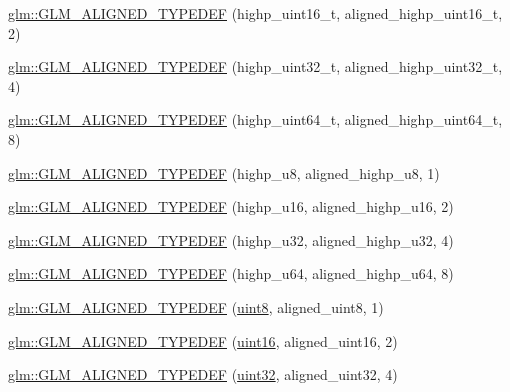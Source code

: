 \begin{DoxyCompactItemize}
\item 
\hyperlink{group__gtx__type__aligned_ga9fc4421dbb833d5461e6d4e59dcfde55}{glm\+::\+G\+L\+M\+\_\+\+A\+L\+I\+G\+N\+E\+D\+\_\+\+T\+Y\+P\+E\+D\+E\+F} (highp\+\_\+uint16\+\_\+t, aligned\+\_\+highp\+\_\+uint16\+\_\+t, 2)
\item 
\hyperlink{group__gtx__type__aligned_ga329f1e2b94b33ba5e3918197030bcf03}{glm\+::\+G\+L\+M\+\_\+\+A\+L\+I\+G\+N\+E\+D\+\_\+\+T\+Y\+P\+E\+D\+E\+F} (highp\+\_\+uint32\+\_\+t, aligned\+\_\+highp\+\_\+uint32\+\_\+t, 4)
\item 
\hyperlink{group__gtx__type__aligned_ga71e646f7e301aa422328194162c9c998}{glm\+::\+G\+L\+M\+\_\+\+A\+L\+I\+G\+N\+E\+D\+\_\+\+T\+Y\+P\+E\+D\+E\+F} (highp\+\_\+uint64\+\_\+t, aligned\+\_\+highp\+\_\+uint64\+\_\+t, 8)
\item 
\hyperlink{group__gtx__type__aligned_ga8942e09f479489441a7a5004c6d8cb66}{glm\+::\+G\+L\+M\+\_\+\+A\+L\+I\+G\+N\+E\+D\+\_\+\+T\+Y\+P\+E\+D\+E\+F} (highp\+\_\+u8, aligned\+\_\+highp\+\_\+u8, 1)
\item 
\hyperlink{group__gtx__type__aligned_gaab32497d6e4db16ee439dbedd64c5865}{glm\+::\+G\+L\+M\+\_\+\+A\+L\+I\+G\+N\+E\+D\+\_\+\+T\+Y\+P\+E\+D\+E\+F} (highp\+\_\+u16, aligned\+\_\+highp\+\_\+u16, 2)
\item 
\hyperlink{group__gtx__type__aligned_gaaadbb34952eca8e3d7fe122c3e167742}{glm\+::\+G\+L\+M\+\_\+\+A\+L\+I\+G\+N\+E\+D\+\_\+\+T\+Y\+P\+E\+D\+E\+F} (highp\+\_\+u32, aligned\+\_\+highp\+\_\+u32, 4)
\item 
\hyperlink{group__gtx__type__aligned_ga92024d27c74a3650afb55ec8e024ed25}{glm\+::\+G\+L\+M\+\_\+\+A\+L\+I\+G\+N\+E\+D\+\_\+\+T\+Y\+P\+E\+D\+E\+F} (highp\+\_\+u64, aligned\+\_\+highp\+\_\+u64, 8)
\item 
\hyperlink{group__gtx__type__aligned_gabde1d0b4072df35453db76075ab896a6}{glm\+::\+G\+L\+M\+\_\+\+A\+L\+I\+G\+N\+E\+D\+\_\+\+T\+Y\+P\+E\+D\+E\+F} (\hyperlink{stb__image_8c_adde6aaee8457bee49c2a92621fe22b79}{uint8}, aligned\+\_\+uint8, 1)
\item 
\hyperlink{group__gtx__type__aligned_ga06c296c9e398b294c8c9dd2a7693dcbb}{glm\+::\+G\+L\+M\+\_\+\+A\+L\+I\+G\+N\+E\+D\+\_\+\+T\+Y\+P\+E\+D\+E\+F} (\hyperlink{stb__image_8c_a05f6b0ae8f6a6e135b0e290c25fe0e4e}{uint16}, aligned\+\_\+uint16, 2)
\item 
\hyperlink{group__gtx__type__aligned_gacf1744488c96ebd33c9f36ad33b2010a}{glm\+::\+G\+L\+M\+\_\+\+A\+L\+I\+G\+N\+E\+D\+\_\+\+T\+Y\+P\+E\+D\+E\+F} (\hyperlink{stb__image_8c_a1134b580f8da4de94ca6b1de4d37975e}{uint32}, aligned\+\_\+uint32, 4)

\end{DoxyCompactItemize}
